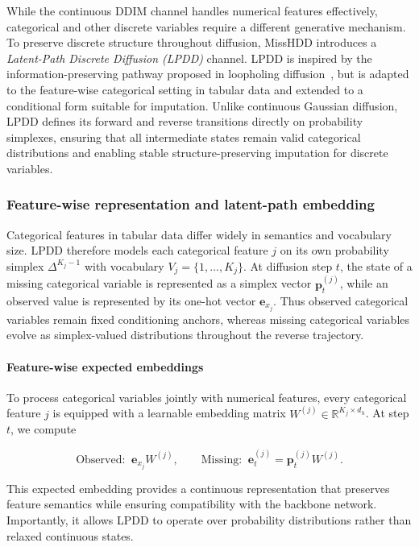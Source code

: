\documentclass[times, review, 10pt]{elsarticle}
\begin{document}
While the continuous DDIM channel handles numerical features effectively,
categorical and other discrete variables require a different generative
mechanism. To preserve discrete structure throughout diffusion, MissHDD
introduces a \emph{Latent-Path Discrete Diffusion (LPDD)} channel. LPDD is
inspired by the information-preserving pathway proposed in loopholing
diffusion~\cite{loopholing}, but is adapted to the feature-wise categorical
setting in tabular data and extended to a conditional form suitable for
imputation. Unlike continuous Gaussian diffusion, LPDD defines its forward
and reverse transitions directly on probability simplexes, ensuring that all
intermediate states remain valid categorical distributions and enabling
stable structure-preserving imputation for discrete variables.




\subsubsection{Feature-wise representation and latent-path embedding}

Categorical features in tabular data differ widely in semantics and vocabulary
size. LPDD therefore models each categorical feature $j$ on its own probability
simplex $\Delta^{K_j-1}$ with vocabulary $V_j=\{1,\dots,K_j\}$. At diffusion
step $t$, the state of a missing categorical variable is represented as a
simplex vector $\mathbf{p}_t^{(j)}$, while an observed value is represented by
its one-hot vector $\mathbf{e}_{x_j}$. Thus observed categorical variables
remain fixed conditioning anchors, whereas missing categorical variables
evolve as simplex-valued distributions throughout the reverse trajectory.

\paragraph{Feature-wise expected embeddings}
To process categorical variables jointly with numerical features, every
categorical feature $j$ is equipped with a learnable embedding matrix
$W^{(j)}\in\mathbb{R}^{K_j\times d_h}$. At step $t$, we compute

\begin{equation}
\text{Observed:}\;\; \mathbf{e}_{x_j}W^{(j)}, \qquad
    \text{Missing:}\;\; \mathbf{e}^{(j)}_t = \mathbf{p}_t^{(j)}W^{(j)}.
\end{equation}


This expected embedding provides a continuous representation that preserves
feature semantics while ensuring compatibility with the backbone network.
Importantly, it allows LPDD to operate over probability distributions rather
than relaxed continuous states.
\end{document}
